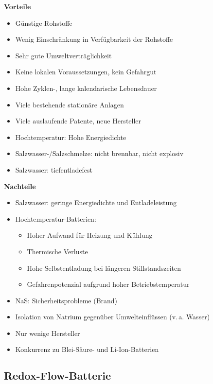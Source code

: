 \begin{minipage}{0.48\textwidth}
\textbf{Vorteile}
\begin{itemize}
  \item Günstige Rohstoffe
  \item Wenig Einschränkung in Verfügbarkeit der Rohstoffe
  \item Sehr gute Umweltverträglichkeit
  \item Keine lokalen Voraussetzungen, kein Gefahrgut
  \item Hohe Zyklen-, lange kalendarische Lebensdauer
  \item Viele bestehende stationäre Anlagen
  \item Viele auslaufende Patente, neue Hersteller
  \item Hochtemperatur: Hohe Energiedichte
  \item Salzwasser-/Salzschmelze: nicht brennbar, nicht explosiv
  \item Salzwasser: tiefentladefest
\end{itemize}
\end{minipage}
\hfill
\begin{minipage}{0.48\textwidth}
\vspace{0.1cm}
\textbf{Nachteile}
\begin{itemize}
  \item Salzwasser: geringe Energiedichte und Entladeleistung
  \item Hochtemperatur-Batterien:
  \begin{itemize}
    \item Hoher Aufwand für Heizung und Kühlung
    \item Thermische Verluste
    \item Hohe Selbstentladung bei längeren Stillstandszeiten
    \item Gefahrenpotenzial aufgrund hoher Betriebstemperatur
  \end{itemize}
  \item NaS: Sicherheitsprobleme (Brand)
  \item Isolation von Natrium gegenüber Umwelteinflüssen (v.\,a. Wasser)
  \item Nur wenige Hersteller
  \item Konkurrenz zu Blei-Säure- und Li-Ion-Batterien
\end{itemize}
\end{minipage}



\subsection{Redox-Flow-Batterie}

